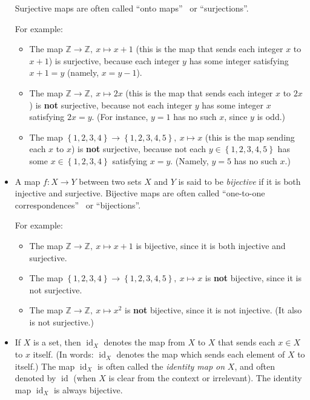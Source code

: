 \documentclass[numbers=enddot,12pt,final,onecolumn,notitlepage]{scrartcl}%
\theoremstyle{definition}
\begin{document}
\begin{itemize}
Surjective maps are often called \textquotedblleft onto maps\textquotedblright%
\ or \textquotedblleft surjections\textquotedblright.

For example:

\begin{itemize}
\item The map $\mathbb{Z}\rightarrow\mathbb{Z},\ x\mapsto x+1$ (this is the
map that sends each integer $x$ to $x+1$) is surjective, because each integer
$y$ has some integer satisfying $x+1=y$ (namely, $x=y-1$).

\item The map $\mathbb{Z}\rightarrow\mathbb{Z},\ x\mapsto2x$ (this is the map
that sends each integer $x$ to $2x$) is \textbf{not} surjective, because not
each integer $y$ has some integer $x$ satisfying $2x=y$. (For instance, $y=1$
has no such $x$, since $y$ is odd.)

\item The map $\left\{  1,2,3,4\right\}  \rightarrow\left\{
1,2,3,4,5\right\}  ,\ x\mapsto x$ (this is the map sending each $x$ to $x$) is
\textbf{not} surjective, because not each $y\in\left\{  1,2,3,4,5\right\}  $
has some $x\in\left\{  1,2,3,4\right\}  $ satisfying $x=y$. (Namely, $y=5$ has
no such $x$.)
\end{itemize}

\item A map $f:X\rightarrow Y$ between two sets $X$ and $Y$ is said to be
\textit{bijective} if it is both injective and surjective. Bijective maps are
often called \textquotedblleft one-to-one correspondences\textquotedblright%
\ or \textquotedblleft bijections\textquotedblright.

For example:

\begin{itemize}
\item The map $\mathbb{Z}\rightarrow\mathbb{Z},\ x\mapsto x+1$ is bijective,
since it is both injective and surjective.

\item The map $\left\{  1,2,3,4\right\}  \rightarrow\left\{
1,2,3,4,5\right\}  ,\ x\mapsto x$ is \textbf{not} bijective, since it is not surjective.

\item The map $\mathbb{Z}\rightarrow\mathbb{Z},\ x\mapsto x^{2}$ is
\textbf{not} bijective, since it is not injective. (It also is not surjective.)
\end{itemize}

\item If $X$ is a set, then $\operatorname*{id}\nolimits_{X}$ denotes the map
from $X$ to $X$ that sends each $x\in X$ to $x$ itself. (In words:
$\operatorname*{id}\nolimits_{X}$ denotes the map which sends each element of
$X$ to itself.) The map $\operatorname*{id}\nolimits_{X}$ is often called the
\textit{identity map on }$X$, and often denoted by $\operatorname*{id}$ (when
$X$ is clear from the context or irrelevant). The identity map
$\operatorname*{id}\nolimits_{X}$ is always bijective.


\end{itemize}
\end{document}
